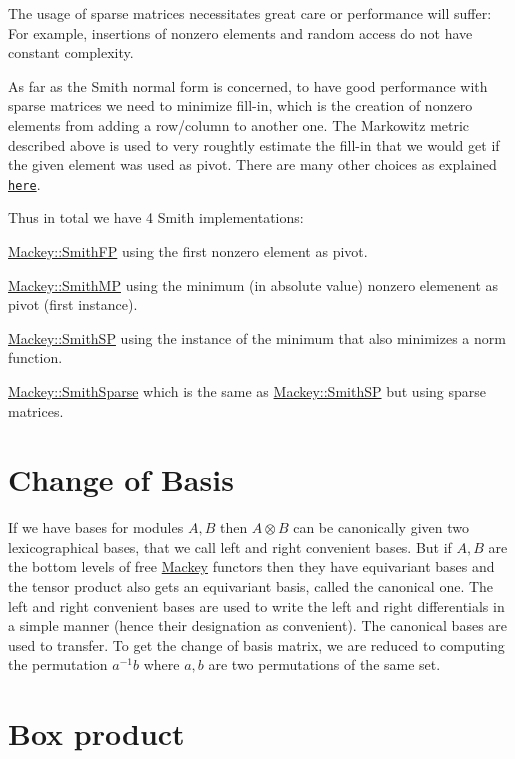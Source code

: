 The usage of sparse matrices necessitates great care or performance will suffer\+: For example, insertions of nonzero elements and random access do not have constant complexity.

As far as the Smith normal form is concerned, to have good performance with sparse matrices we need to minimize fill-\/in, which is the creation of nonzero elements from adding a row/column to another one. The Markowitz metric described above is used to very roughtly estimate the fill-\/in that we would get if the given element was used as pivot. There are many other choices as explained \href{https://arxiv.org/abs/math/9406205}{\tt here}.

Thus in total we have 4 Smith implementations\+:


\begin{DoxyItemize}
\item {\ttfamily \hyperlink{classMackey_1_1SmithFP}{Mackey\+::\+Smith\+FP}} using the first nonzero element as pivot.
\item {\ttfamily \hyperlink{classMackey_1_1SmithMP}{Mackey\+::\+Smith\+MP}} using the minimum (in absolute value) nonzero elemenent as pivot (first instance).
\item {\ttfamily \hyperlink{classMackey_1_1SmithSP}{Mackey\+::\+Smith\+SP}} using the instance of the minimum that also minimizes a norm function.
\item {\ttfamily \hyperlink{classMackey_1_1SmithSparse}{Mackey\+::\+Smith\+Sparse}} which is the same as {\ttfamily \hyperlink{classMackey_1_1SmithSP}{Mackey\+::\+Smith\+SP}} but using sparse matrices.
\end{DoxyItemize}\hypertarget{algo_cob}{}\section{Change of Basis}\label{algo_cob}
If we have bases for modules $A,B$ then $A\otimes B$ can be canonically given two lexicographical bases, that we call left and right convenient bases. But if $A,B$ are the bottom levels of free \hyperlink{namespaceMackey}{Mackey} functors then they have equivariant bases and the tensor product also gets an equivariant basis, called the canonical one. The left and right convenient bases are used to write the left and right differentials in a simple manner (hence their designation as convenient). The canonical bases are used to transfer. To get the change of basis matrix, we are reduced to computing the permutation $a^{-1}b$ where $a,b$ are two permutations of the same set.\hypertarget{algo_box}{}\section{Box product}\label{algo_box}
